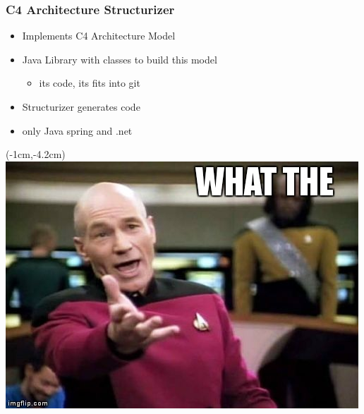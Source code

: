 \documentclass[xelatex,13pt]{beamer}
\begin{document}
\begin{frame}
	\frametitle{C4 Architecture Structurizer}
	\begin{itemize}
		\item Implements C4 Architecture Model 
		\item Java Library with classes to build this model
		\begin{itemize}
			\item its code, its fits into git
		\end{itemize}
		\item Structurizer generates code
		\item {\huge only Java spring and .net}
	\end{itemize}
\end{frame}
\begin{frame}[plain]
\begin{textblock*}{0cm}(-1cm,-4.2cm)
	\includegraphics[width=1.0\paperwidth]{picardwtf.jpg}
\end{textblock*}
\end{frame}
\end{document}
